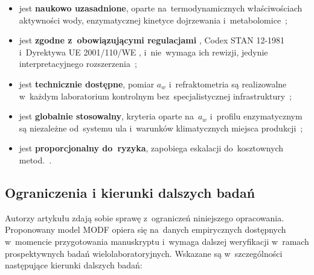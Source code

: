 \begin{itemize}
    \item jest \textbf{naukowo uzasadnione}, oparte
          na~termodynamicznych właściwościach aktywności
          wody, enzymatycznej kinetyce dojrzewania
          i~metabolomice~\cite{ruegg1981,zhang2021,guo2020};
    \item jest \textbf{zgodne z~obowiązującymi regulacjami}
         , Codex STAN 12-1981 i~Dyrektywa UE 2001/110/WE
         , i~nie~wymaga ich rewizji, jedynie interpretacyjnego
          rozszerzenia~\cite{codex_stan12,eudir2001110};
    \item jest \textbf{technicznie dostępne}, pomiar $a_w$
          i~refraktometria są realizowalne w~każdym
          laboratorium kontrolnym bez~specjalistycznej
          infrastruktury~\cite{waaw2006,zamora2006};
    \item jest \textbf{globalnie stosowalny}, kryteria oparte
          na~$a_w$ i~profilu enzymatycznym są niezależne
          od~systemu ula i~warunków klimatycznych
          miejsca produkcji~\cite{tadele2025,stinglessyeastbrazil2021};
    \item jest \textbf{proporcjonalny do~ryzyka},
          zapobiega eskalacji do~kosztownych metod.~\cite{schoder2026,nmrhoney2023}.
\end{itemize}

\subsection{Ograniczenia i kierunki dalszych badań}

Autorzy artykułu zdają sobie sprawę z~ograniczeń
niniejszego opracowania. Proponowany model MODF opiera
się na~danych empirycznych dostępnych w~momencie
przygotowania manuskryptu i~wymaga dalszej weryfikacji
w~ramach prospektywnych badań wielolaboratoryjnych.
Wskazane są w~szczególności następujące kierunki
dalszych badań:

